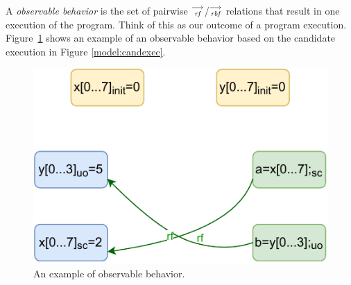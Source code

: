     \begin{definition}
        A \emph{observable behavior} is the set of pairwise $\stackrel{\longrightarrow}{_\textit{rf}}$/$\stackrel{\longrightarrow}{_\textit{rbf}}$ relations that result in one execution of the program. 
        Think of this as our outcome of a program execution.
        Figure~\ref{model:observable} shows an example of an observable behavior based on the candidate execution in Figure \ref{model:candexec}.
        \begin{figure}[H]
            \centering
            \includegraphics[scale=0.7]{3.ECMAScriptMemoryModel/Observables.pdf}
            \caption{An example of observable behavior.}
            \label{model:observable}
        \end{figure}
        
    \end{definition}

    